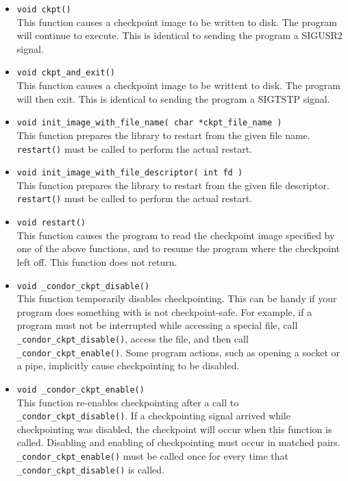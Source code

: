 \begin{itemize}

\item \verb$void ckpt()$\\
This function causes a checkpoint image to be written to disk.
The program will continue to execute.  This is identical to sending
the program a SIGUSR2 signal.

\item \verb$void ckpt_and_exit()$\\
This function causes a checkpoint image to be writtent to disk.
The program will then exit.  This is identical to sending the program
a SIGTSTP signal.

\item \verb$void init_image_with_file_name( char *ckpt_file_name )$\\
This function prepares the library to restart from the 
given file name. \verb$restart()$ must be called to perform the
actual restart.

\item \verb$void init_image_with_file_descriptor( int fd )$\\
This function prepares the library to restart from
the given file descriptor.  \verb$restart()$ must be called to
perform the actual restart.

\item \verb$void restart()$\\
This function causes the program to read the checkpoint
image specified by one of the above functions, and to resume the
program where the checkpoint left off.  This function does
not return.

\item \verb$void _condor_ckpt_disable()$\\
This function temporarily disables checkpointing.  This can
be handy if your program does something with is not checkpoint-safe.
For example, if a program must not be interrupted while accessing
a special file, call \verb$_condor_ckpt_disable()$, access the
file, and then call \verb$_condor_ckpt_enable()$.  Some program
actions, such as opening a socket or a pipe, implicitly cause
checkpointing to be disabled.

\item \verb$void _condor_ckpt_enable()$\\
This function re-enables checkpointing after a call to
\verb$_condor_ckpt_disable()$.  If a checkpointing signal arrived
while checkpointing was disabled, the checkpoint will occur when
this function is called.  Disabling and enabling of checkpointing
must occur in matched pairs.  \verb$_condor_ckpt_enable()$ must
be called once for every time that \verb$_condor_ckpt_disable()$
is called.


\end{itemize}
